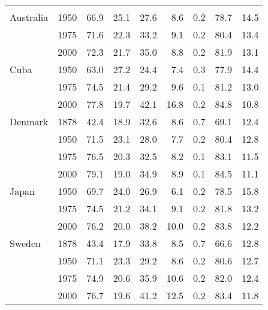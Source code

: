 \begin{longtable}[t]{llrrrrrrr}
\endfoot
\bottomrule
\endlastfoot
\addlinespace[0.3em]
\multicolumn{9}{l}{\textbf{Low mortality}}\\
\hspace{1em}Australia & 1950 & 66.9 & 25.1 & 27.6 & 8.6 & 0.2 & 78.7 & 14.5\\
\hspace{1em} & 1975 & 71.6 & 22.3 & 33.2 & 9.1 & 0.2 & 80.4 & 13.4\\
\hspace{1em} & 2000 & 72.3 & 21.7 & 35.0 & 8.8 & 0.2 & 81.9 & 13.1\\
\hspace{1em}Cuba & 1950 & 63.0 & 27.2 & 24.4 & 7.4 & 0.3 & 77.9 & 14.4\\
\hspace{1em} & 1975 & 74.5 & 21.4 & 29.2 & 9.6 & 0.1 & 81.2 & 13.0\\
\hspace{1em} & 2000 & 77.8 & 19.7 & 42.1 & 16.8 & 0.2 & 84.8 & 10.8\\
\hspace{1em}Denmark & 1878 & 42.4 & 18.9 & 32.6 & 8.6 & 0.7 & 69.1 & 12.4\\
\hspace{1em} & 1950 & 71.5 & 23.1 & 28.0 & 7.7 & 0.2 & 80.4 & 12.8\\
\hspace{1em} & 1975 & 76.5 & 20.3 & 32.5 & 8.2 & 0.1 & 83.1 & 11.5\\
\hspace{1em} & 2000 & 79.1 & 19.0 & 34.9 & 8.9 & 0.1 & 84.5 & 11.1\\
\hspace{1em}Japan & 1950 & 69.7 & 24.0 & 26.9 & 6.1 & 0.2 & 78.5 & 15.8\\
\hspace{1em} & 1975 & 74.5 & 21.2 & 34.1 & 9.1 & 0.2 & 81.8 & 13.2\\
\hspace{1em} & 2000 & 76.2 & 20.0 & 38.2 & 10.0 & 0.2 & 83.8 & 12.2\\
\hspace{1em}Sweden & 1878 & 43.4 & 17.9 & 33.8 & 8.5 & 0.7 & 66.6 & 12.8\\
\hspace{1em} & 1950 & 71.1 & 23.3 & 29.2 & 8.6 & 0.2 & 80.6 & 12.7\\
\hspace{1em} & 1975 & 74.9 & 20.6 & 35.9 & 10.6 & 0.2 & 82.0 & 12.4\\
\hspace{1em} & 2000 & 76.7 & 19.6 & 41.2 & 12.5 & 0.2 & 83.4 & 11.8\\

\end{longtable}
